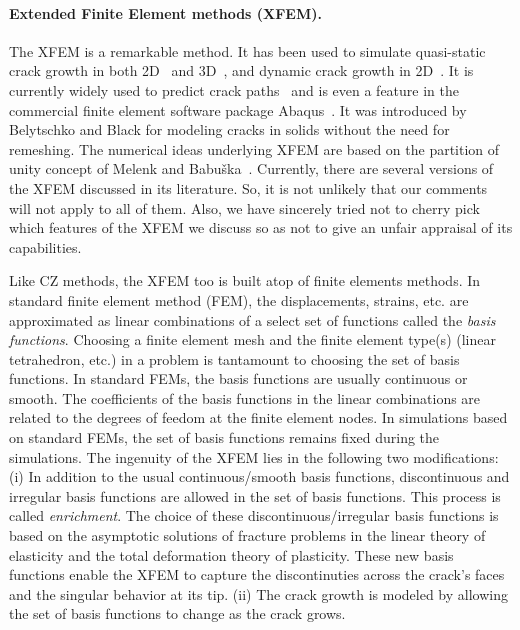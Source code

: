 \documentclass[12pt,onecolumn]{article}
\begin{document}
\paragraph{Extended Finite Element methods (XFEM).} The XFEM is a remarkable method. It has been used to  simulate quasi-static crack growth in both 2D~\cite{belytschko1999elastic,bordas2007extended,dolbow1999finite} and 3D~\cite{sukumar2000extended,moes2002non,gravouil2002non}, and dynamic crack growth in 2D~\cite{belytschko2003dynamic,song2006method}. It is currently widely used to predict crack paths~\cite{golewski2012numerical,barkai2012crack,peng2017extended} and is even a feature in the commercial finite element software package Abaqus~\cite{abaqus2014}.
It was introduced by Belytschko and Black \cite{belytschko1999elastic} for modeling cracks in solids without the need for remeshing. The numerical ideas underlying XFEM  are based on the partition of unity concept of Melenk and Babu\v ska~\cite{melenk1996partition}.  Currently, there are several versions of the XFEM  discussed in its literature. So, it is not unlikely that our comments will not apply to all of them. Also, we have sincerely tried not to cherry pick which features of the XFEM we discuss so as not to give an unfair appraisal of its capabilities.%




Like CZ methods, the XFEM too is built atop of finite elements methods. In  standard finite element method (FEM), the displacements, strains, etc. are approximated as  linear combinations of a select set of functions called  the \textit{basis functions}. Choosing a finite element mesh and the finite element type(s) (linear tetrahedron, etc.) in a problem  is tantamount to choosing the set of basis functions. In standard FEMs, the basis functions are usually continuous or smooth. The coefficients of the basis functions in the linear combinations are related to the degrees of feedom at the finite element nodes. In simulations based on  standard FEMs, the set of basis functions remains fixed during the simulations. The ingenuity of the XFEM lies in the following two modifications: (i) In addition to the usual continuous/smooth basis functions, discontinuous and irregular basis functions are allowed in the  set of basis functions. This process is called \textit{enrichment}. The choice of these discontinuous/irregular basis functions is  based  on the asymptotic solutions of fracture problems in the linear theory of elasticity and the total deformation theory of plasticity. These new basis functions enable the XFEM to capture the discontinuties across the crack's faces and the singular behavior  at its  tip. (ii) The  crack growth is modeled by allowing the set of basis functions to change as the crack grows.%
\end{document}
